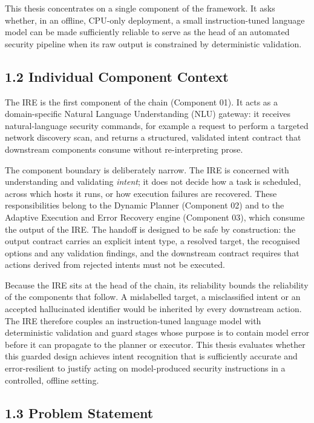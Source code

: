\documentclass[
]{article}
\begin{document}
This thesis concentrates on a single component of the framework. It asks
whether, in an offline, CPU-only deployment, a small instruction-tuned
language model can be made sufficiently reliable to serve as the head of
an automated security pipeline when its raw output is constrained by
deterministic validation.

\hypertarget{individual-component-context}{%
\subsection{1.2 Individual Component
Context}\label{individual-component-context}}

The IRE is the first component of the chain (Component 01). It acts as a
domain-specific Natural Language Understanding (NLU) gateway: it
receives natural-language security commands, for example a request to
perform a targeted network discovery scan, and returns a structured,
validated intent contract that downstream components consume without
re-interpreting prose.

The component boundary is deliberately narrow. The IRE is concerned with
understanding and validating \emph{intent}; it does not decide how a
task is scheduled, across which hosts it runs, or how execution failures
are recovered. These responsibilities belong to the Dynamic Planner
(Component 02) and to the Adaptive Execution and Error Recovery engine
(Component 03), which consume the output of the IRE. The handoff is
designed to be safe by construction: the output contract carries an
explicit intent type, a resolved target, the recognised options and any
validation findings, and the downstream contract requires that actions
derived from rejected intents must not be executed.

Because the IRE sits at the head of the chain, its reliability bounds
the reliability of the components that follow. A mislabelled target, a
misclassified intent or an accepted hallucinated identifier would be
inherited by every downstream action. The IRE therefore couples an
instruction-tuned language model with deterministic validation and guard
stages whose purpose is to contain model error before it can propagate
to the planner or executor. This thesis evaluates whether this guarded
design achieves intent recognition that is sufficiently accurate and
error-resilient to justify acting on model-produced security
instructions in a controlled, offline setting.

\hypertarget{problem-statement}{%
\subsection{1.3 Problem Statement}\label{problem-statement}}
\end{document}
